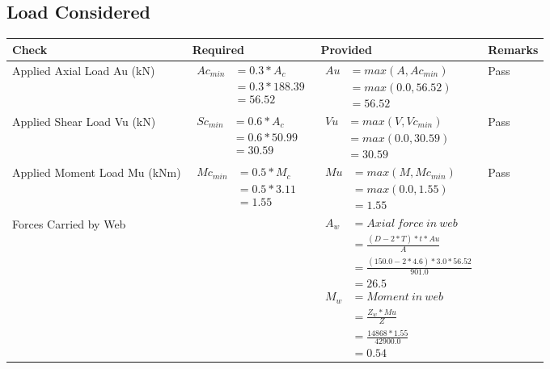 \documentclass{article}%
\begin{document}
\subsection{Load Considered}%
\label{subsec:LoadConsidered}%
\renewcommand{\arraystretch}{1.2}%
\begin{longtable}{|p{4cm}|p{5cm}|p{5.5cm}|p{1.5cm}|}%
\hline%
\rowcolor{OsdagGreen}%
Check&Required&Provided&Remarks\\%
\hline%
\endhead%
\hline%
Applied Axial Load Au (kN)&$\begin{aligned} Ac_{min} &= 0.3 * A_c\\ &= 0.3 *188.39\\ &=56.52\end{aligned}$&$\begin{aligned} Au &= max(A,Ac_{min} )\\ &= max( 0.0,56.52)\\ &=56.52\end{aligned}$&Pass\\%
\hline%
Applied Shear Load Vu (kN)&$\begin{aligned} Sc_{min} &= 0.6 * A_c\\ &= 0.6 *50.99\\ &=30.59\end{aligned}$&$\begin{aligned} Vu &= max(V,Vc_{min})\\ &=  max(0.0,30.59)\\ &=30.59\end{aligned}$&Pass\\%
\hline%
Applied Moment Load Mu (kNm)&$\begin{aligned} Mc_{min} &= 0.5 * M_c\\ &= 0.5 *3.11\\ &=1.55\end{aligned}$&$\begin{aligned} Mu &= max(M,Mc_{min} )\\ &= max(0.0,1.55)\\ &=1.55\end{aligned}$&Pass\\%
\hline%
Forces Carried by Web&&$\begin{aligned}A_w &= Axial~ force~ in~ web  \\   &= \frac{(D- 2*T)*t* Au }{A} \\ &= \frac{(150.0- 2*4.6)*3.0*56.52 }{901.0} \\ &=26.5\\ M_w &= Moment ~in ~web  \\  &= \frac{Z_w * Mu}{Z} \\ &= \frac{14868 * 1.55}{42900.0} \\ &=0.54\end{aligned}$&\\%

\end{longtable}
\end{document}

